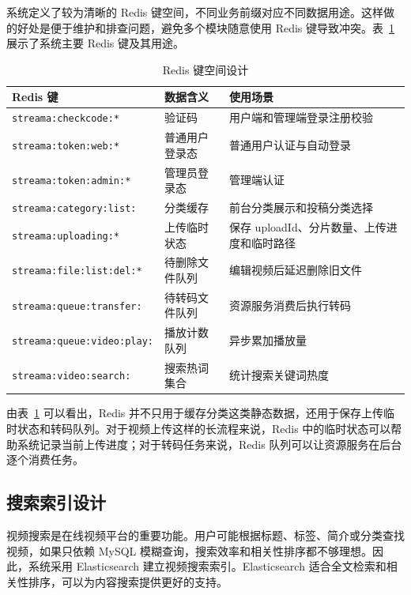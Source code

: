 系统定义了较为清晰的 Redis 键空间，不同业务前缀对应不同数据用途。这样做的好处是便于维护和排查问题，避免多个模块随意使用 Redis 键导致冲突。表~\ref{tab:redis-key-design} 展示了系统主要 Redis 键及其用途。

\begin{table}[htbp]
  \centering
  \caption{Redis 键空间设计}
  \label{tab:redis-key-design}
  \begin{tabular}{p{}p{}p{}}
    \hline
    \textbf{Redis 键} & \textbf{数据含义} & \textbf{使用场景} \\
    \hline
    \texttt{streama:checkcode:*} & 验证码 & 用户端和管理端登录注册校验 \\
    \texttt{streama:token:web:*} & 普通用户登录态 & 普通用户认证与自动登录 \\
    \texttt{streama:token:admin:*} & 管理员登录态 & 管理端认证 \\
    \texttt{streama:category:list:} & 分类缓存 & 前台分类展示和投稿分类选择 \\
    \texttt{streama:uploading:*} & 上传临时状态 & 保存 uploadId、分片数量、上传进度和临时路径 \\
    \texttt{streama:file:list:del:*} & 待删除文件队列 & 编辑视频后延迟删除旧文件 \\
    \texttt{streama:queue:transfer:} & 待转码文件队列 & 资源服务消费后执行转码 \\
    \texttt{streama:queue:video:play:} & 播放计数队列 & 异步累加播放量 \\
    \texttt{streama:video:search:} & 搜索热词集合 & 统计搜索关键词热度 \\
    \hline
  \end{tabular}
\end{table}

由表~\ref{tab:redis-key-design} 可以看出，Redis 并不只用于缓存分类这类静态数据，还用于保存上传临时状态和转码队列。对于视频上传这样的长流程来说，Redis 中的临时状态可以帮助系统记录当前上传进度；对于转码任务来说，Redis 队列可以让资源服务在后台逐个消费任务。

\subsection{搜索索引设计}
\label{subsec:search-index-design}

视频搜索是在线视频平台的重要功能。用户可能根据标题、标签、简介或分类查找视频，如果只依赖 MySQL 模糊查询，搜索效率和相关性排序都不够理想。因此，系统采用 Elasticsearch 建立视频搜索索引。Elasticsearch 适合全文检索和相关性排序，可以为内容搜索提供更好的支持\cite{elasticsearchdocs}。

